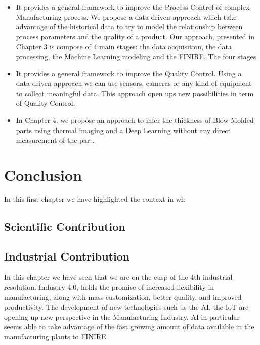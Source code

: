 \begin{itemize}
    \item It provides a general framework to improve the Process Control of complex Manufacturing process. We propose a data-driven approach which take advantage of the historical data to try to model the relationship between process parameters and the quality of a product. Our approach, presented in Chapter 3 is compose of 4 main stages: the data acquisition, the data processing, the Machine Learning modeling and the FINIRE. The four stages 
    \item It provides a general framework to improve the Quality Control. Using a data-driven approach we can use sensors, cameras or any kind of equipment to collect meaningful data. This approach open ups new possibilities in term of Quality Control.  
    \item In Chapter 4, we propose an approach to infer the thickness of Blow-Molded parts using thermal imaging and a Deep Learning without any direct measurement of the part.   
\end{itemize}


\section{Conclusion}

In this first chapter we have highlighted the context in wh

\subsection{Scientific Contribution}

\subsection{Industrial Contribution}

In this chapter we have seen that we are on the cusp of the 4th industrial resolution. Industry 4.0, holds the promise of increased flexibility in manufacturing, along with mass customization, better quality, and improved productivity. The development of new technologies such us the AI, the IoT are opening up new perspective in the Manufacturing Industry. AI in particular seems able to take advantage of the fast growing amount of data available in the manufacturing plants to FINIRE 
